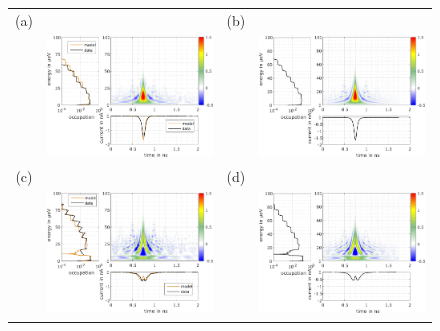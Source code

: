 \begin{figure}[hptb]
	\begin{center}
		\begin{tabular}{c c c c}
			
			(a) & & (b) &  \\ 
			& \includegraphics[width = 6.5 cm]{./chap1/wannierwigAC_Data_leviton_40ps_1e_JMAP_f_vf-el-0} &
			& \includegraphics[width = 6.5 cm]{./chap1/wannierwigTheory_AC_leviton_50ps_1e_60mK_2GHz-el-0} \\
			(c) & & (d) &  \\ 
			& \includegraphics[width = 6.5 cm]{./chap1/wannierwigAC_Data_leviton_40ps_1e_JMAP_f_vf-el-1} &
			& \includegraphics[width = 6.5 cm]{./chap1/wannierwigTheory_AC_leviton_50ps_1e_60mK_2GHz-el-1} \\

\end{tabular}
\end{center}
\end{figure}

